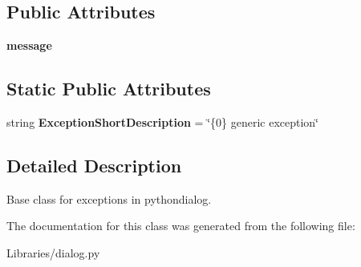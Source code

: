 \subsection*{Public Attributes}
\begin{DoxyCompactItemize}
\item 
{\bfseries message}\hypertarget{class_libraries_1_1dialog_1_1error_aa8f2cfa0c126cbcd972ef92068e2b4dd}{}\label{class_libraries_1_1dialog_1_1error_aa8f2cfa0c126cbcd972ef92068e2b4dd}

\end{DoxyCompactItemize}
\subsection*{Static Public Attributes}
\begin{DoxyCompactItemize}
\item 
string {\bfseries Exception\+Short\+Description} = \char`\"{}\{0\} generic exception\char`\"{}\hypertarget{class_libraries_1_1dialog_1_1error_a8567c15e7ec89cfde31c13f917b97f57}{}\label{class_libraries_1_1dialog_1_1error_a8567c15e7ec89cfde31c13f917b97f57}

\end{DoxyCompactItemize}


\subsection{Detailed Description}
\begin{DoxyVerb}Base class for exceptions in pythondialog.\end{DoxyVerb}
 

The documentation for this class was generated from the following file\+:\begin{DoxyCompactItemize}
\item 
Libraries/dialog.\+py\end{DoxyCompactItemize}
